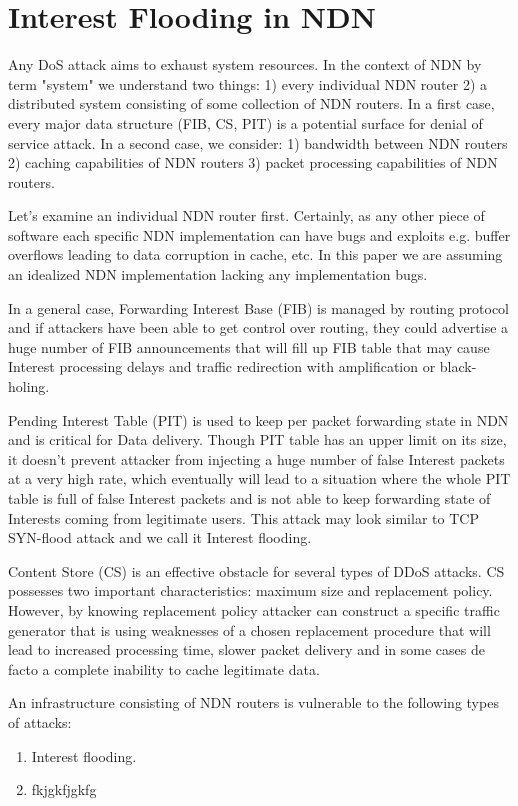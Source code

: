 \section{Interest Flooding in NDN}
\label{sec:interest flooding}

Any DoS attack aims to exhaust system resources. In the context of NDN by term "system" we understand two things: 1) every individual NDN router 2) a distributed system consisting of some collection of NDN routers. In a first case, every major data structure (FIB, CS, PIT) is a potential surface for denial of service attack. In a second case, we consider: 1) bandwidth between NDN routers 2) caching capabilities of NDN routers 3) packet processing capabilities of NDN routers.

Let's examine an individual NDN router first. Certainly, as any other piece of software each specific NDN implementation can have bugs and exploits e.g. buffer overflows leading to data corruption in cache, etc. In this paper we are assuming an idealized NDN implementation lacking any implementation bugs. 

In a general case, Forwarding Interest Base (FIB) is managed by routing protocol and if attackers have been able to get control over routing, they could advertise a huge number of FIB announcements that will fill up FIB table that may cause Interest processing delays and traffic redirection with amplification or black-holing.

Pending Interest Table (PIT) is used to keep per packet forwarding state in NDN and is critical for Data delivery. Though PIT table has an upper limit on its size, it doesn't prevent attacker from injecting a huge number of false Interest packets at a very high rate, which eventually will lead to a situation where the whole PIT table is full of false Interest packets and is not able to keep forwarding state of Interests coming from legitimate users. This attack may look similar to TCP SYN-flood attack and we call it Interest flooding. 

Content Store (CS) is an effective obstacle for several types of DDoS attacks. CS possesses two important characteristics: maximum size and replacement policy. However, by knowing replacement policy attacker can construct a specific traffic generator that is using weaknesses of a chosen replacement procedure that will lead to increased processing time, slower packet delivery and in some cases de facto a complete inability to cache legitimate data. 

An infrastructure consisting of NDN routers is vulnerable to the following types of attacks: 
\begin{enumerate}
\item Interest flooding. 
\item fkjgkfjgkfg
\end{enumerate} 


